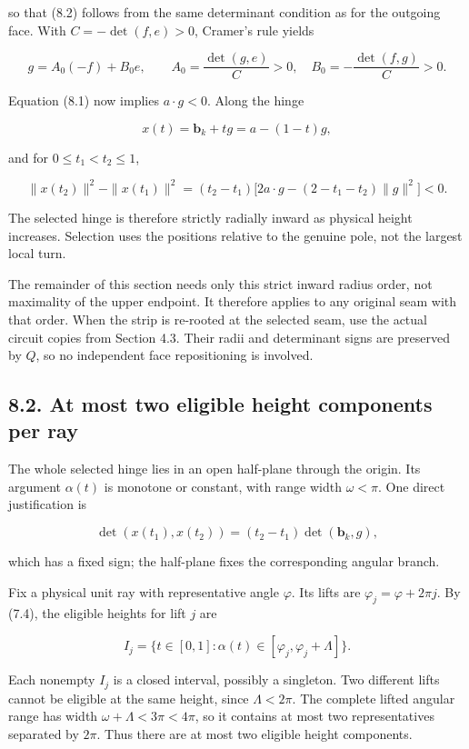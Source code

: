 \documentclass[
  11pt,
  letterpaper,
]{article}
\begin{document}
so that (8.2) follows from the same determinant condition as for the
outgoing face. With \(C=-\det(f,e)>0\), Cramer's rule yields

\[
g=A_0(-f)+B_0e,
\qquad A_0=\frac{\det(g,e)}{C}>0,
\quad B_0=-\frac{\det(f,g)}{C}>0.
\]

Equation (8.1) now implies \(a\cdot g<0\). Along the hinge

\[
x(t)=\mathbf b_k+tg=a-(1-t)g,
\]

and for \(0\le t_1<t_2\le1\),

\[
\|x(t_2)\|^2-\|x(t_1)\|^2
=(t_2-t_1)\bigl[2a\cdot g-(2-t_1-t_2)\|g\|^2\bigr]<0.
\tag{8.3}
\]

The selected hinge is therefore strictly radially inward as physical
height increases. Selection uses the positions relative to the genuine
pole, not the largest local turn.

The remainder of this section needs only this strict inward radius
order, not maximality of the upper endpoint. It therefore applies to any
original seam with that order. When the strip is re-rooted at the
selected seam, use the actual circuit copies from Section 4.3. Their
radii and determinant signs are preserved by \(Q\), so no independent
face repositioning is involved.

\subsection{8.2. At most two eligible height components per
ray}\label{at-most-two-eligible-height-components-per-ray}

The whole selected hinge lies in an open half-plane through the origin.
Its argument \(\alpha(t)\) is monotone or constant, with range width
\(\omega<\pi\). One direct justification is

\[
\det(x(t_1),x(t_2))=(t_2-t_1)\det(\mathbf b_k,g),
\]

which has a fixed sign; the half-plane fixes the corresponding angular
branch.

Fix a physical unit ray with representative angle \(\varphi\). Its lifts
are \(\varphi_j=\varphi+2\pi j\). By (7.4), the eligible heights for
lift \(j\) are

\[
I_j=\{t\in[0,1]:\alpha(t)\in[\varphi_j,\varphi_j+\Lambda]\}.
\tag{8.4}
\]

Each nonempty \(I_j\) is a closed interval, possibly a singleton. Two
different lifts cannot be eligible at the same height, since
\(\Lambda<2\pi\). The complete lifted angular range has width
\(\omega+\Lambda<3\pi<4\pi\), so it contains at most two representatives
separated by \(2\pi\). Thus there are at most two eligible height
components.
\end{document}
